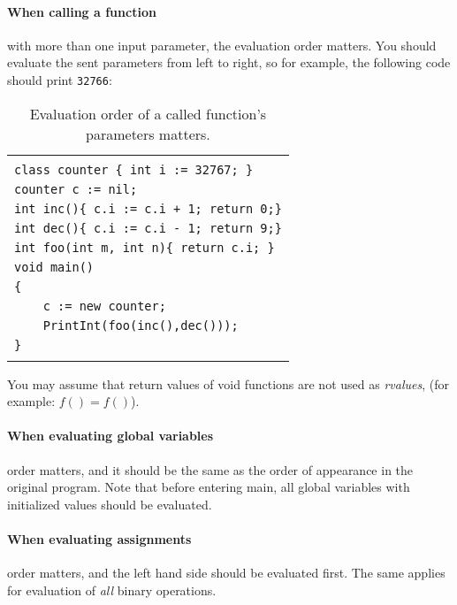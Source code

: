 \documentclass{article}
\begin{document}
\paragraph{When calling a function} with more than one input parameter,
the evaluation order matters. You should evaluate the sent parameters
from left to right, so for example, the following code should print \verb"32766":
\begin{table}[h]
\centering
\begin{tabular}{|l|}
\hline
                                               \\
\verb"class counter { int i := 32767; }"       \\
\verb"counter c := nil;"                       \\
\verb"int inc(){ c.i := c.i + 1; return 0;}"   \\
\verb"int dec(){ c.i := c.i - 1; return 9;}"   \\
\verb"int foo(int m, int n){ return c.i; }"    \\
\verb"void main()"                             \\
\verb"{"                                       \\
\verb"    c := new counter;"                                       \\
\verb"    PrintInt(foo(inc(),dec()));"         \\
\verb"}"                                       \\
                                               \\
\hline
\end{tabular}
\caption{Evaluation order of a called function's parameters matters.
\label{Table_Code_Example_Evaluation_Order_Function_Call}}
\end{table}
You may assume that return values of void functions are not used as \textit{rvalues}, (for example: $f() = f()$).
\paragraph{When evaluating global variables}
\label{Paragraph_When_Evaluating_Global_Variables}
order matters,
and it should be the same as the order of appearance in the original program.
Note that before entering main, all global variables with initialized values
should be evaluated.
\paragraph{When evaluating assignments} order matters,
and the left hand side should be evaluated first.
The same applies for evaluation of \textit{all} binary operations.
\end{document}
